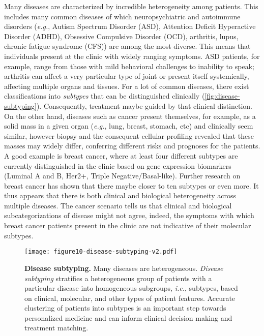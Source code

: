 \documentclass[5p]{elsarticle}
\newcommand{\eg}{\emph{e.g.}\xspace}
\newcommand{\ie}{\emph{i.e.}\xspace}
\newcommand{\rev}[1]{{\color{black}#1}}
\begin{document}
\rev{Many diseases} are characterized by incredible heterogeneity among patients. This includes many common diseases of which neuropsychiatric and autoimmune disorders (\eg, Au\-tism Spectrum Disorder (ASD), Attention Deficit Hyperactive Disorder (ADHD), Obsessive Compulsive Disorder (OCD), ar\-thritis, lupus, chronic fatigue syndrome \rev{(CFS))} are among the most diverse. This means that individuals present at the clinic with widely ranging symptoms. ASD patients, for example, range from those with mild behavioral challenges to inability to speak; arthritis can affect a very particular type of joint or present itself systemically, affecting multiple organs and tissues. For a lot of common diseases, there exist classifications into \emph{subtypes} that can be distinguished clinically (\autoref{fig:disease-subtyping}).  Consequently, treatment maybe guided by that clinical distinction. On the other hand, diseases such as cancer present themselves, for example, as a solid mass in a given organ (\eg, lung, breast, stomach, etc) and clinically seem similar, however biopsy and the consequent cellular profiling revealed that these masses may widely differ, conferring different risks and prognoses for the patients. A good example is breast cancer, where at least four different subtypes are currently distinguished in the clinic based on gene expression biomarkers (Luminal A and B, Her2+, Triple Negative/Basal-like). Further research on breast cancer has sho\-wn that there maybe closer to ten subtypes \cite{Curtis:2012} or even more. It thus appears that there is both clinical and biological heterogeneity across multiple diseases. The cancer scenario tells us that clinical and biological subcategorizations of disease might not agree, indeed, the symptoms with which breast cancer patients present in the clinic are not indicative of their molecular subtypes.

\begin{figure}[t]
\centering
\texttt{[image: figure10-disease-subtyping-v2.pdf]}
\caption{\textbf{Disease subtyping.} Many diseases are heterogeneous. {\em Disease subtyping} stratifies a heterogeneous group of patients with a particular disease into homogeneous subgroups, \ie, subtypes, based on clinical, molecular, and other types of patient features. Accurate clustering of patients into subtypes is an important step towards personalized medicine and can inform clinical decision making and treatment matching.}
\label{fig:disease-subtyping}
\end{figure}
\end{document}
